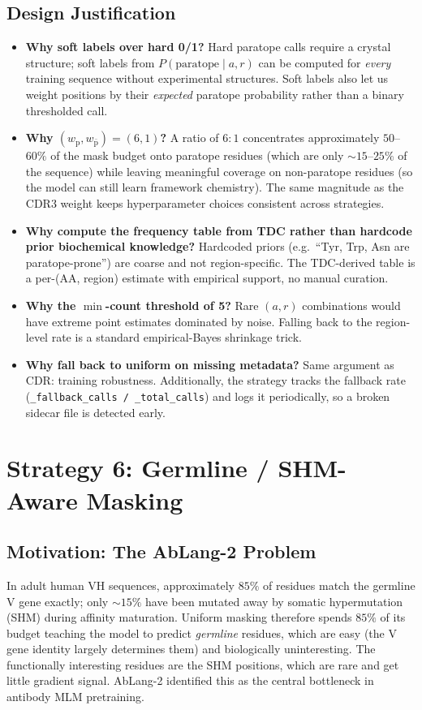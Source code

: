 \documentclass[11pt]{article}
\begin{document}
\subsection{Design Justification}
\begin{itemize}
\item \textbf{Why soft labels over hard 0/1?} Hard paratope calls
require a crystal structure; soft labels from
$P(\text{paratope} \mid a, r)$ can be computed for \emph{every}
training sequence without experimental structures. Soft labels also
let us weight positions by their \emph{expected} paratope probability
rather than a binary thresholded call.
\item \textbf{Why $(w_{\text{p}}, w_{\bar{\text{p}}}) = (6, 1)$?}
A ratio of $6{:}1$ concentrates approximately $50$--$60\%$ of the
mask budget onto paratope residues (which are only $\sim 15$--$25\%$
of the sequence) while leaving meaningful coverage on non-paratope
residues (so the model can still learn framework chemistry). The
same magnitude as the CDR3 weight keeps hyperparameter choices
consistent across strategies.
\item \textbf{Why compute the frequency table from TDC rather than
hardcode prior biochemical knowledge?} Hardcoded priors (e.g.\ ``Tyr,
Trp, Asn are paratope-prone'') are coarse and not region-specific.
The TDC-derived table is a per-(AA, region) estimate with empirical
support, no manual curation.
\item \textbf{Why the $\min$-count threshold of 5?} Rare $(a, r)$
combinations would have extreme point estimates dominated by noise.
Falling back to the region-level rate is a standard empirical-Bayes
shrinkage trick.
\item \textbf{Why fall back to uniform on missing metadata?} Same
argument as CDR: training robustness. Additionally, the strategy
tracks the fallback rate (\texttt{\_fallback\_calls / \_total\_calls})
and logs it periodically, so a broken sidecar file is detected
early.
\end{itemize}

\section{Strategy 6: Germline / SHM-Aware Masking}

\subsection{Motivation: The AbLang-2 Problem}
In adult human VH sequences, approximately $85\%$ of residues match
the germline V gene exactly; only $\sim 15\%$ have been mutated away
by somatic hypermutation (SHM) during affinity maturation. Uniform
masking therefore spends $85\%$ of its budget teaching the model to
predict \emph{germline} residues, which are easy (the V gene identity
largely determines them) and biologically uninteresting. The
functionally interesting residues are the SHM positions, which are
rare and get little gradient signal. AbLang-2 identified this as the
central bottleneck in antibody MLM pretraining.
\end{document}
